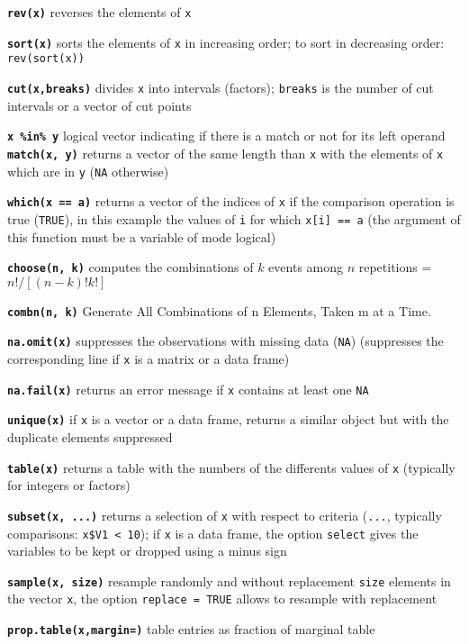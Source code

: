 \documentclass[10pt,landscape]{article}
\newcommand{\code}{\texttt}
\newcommand{\bcode}[1]{\texttt{\textbf{#1}}}
\newcommand\T{\code{TRUE}}
\begin{document}
\begin{multicols*}{3}
\bcode{rev(x)}  reverses the elements of \code{x}

\bcode{sort(x)}  sorts the elements of \code{x} in increasing order; to sort in decreasing order: \code{rev(sort(x))}

\bcode{cut(x,breaks)}  divides \code{x} into intervals (factors);
\code{breaks} is the number of cut intervals or a vector of cut points

\bcode{x \%in\% y} logical vector indicating if there is a match or not
for its left operand\\

\bcode{match(x, y)}  returns a vector of the same length than \code{x} with the elements of \code{x} which are in \code{y} (\code{NA} otherwise)

\bcode{which(x == a)}  returns a vector of the indices of \code{x} if the comparison operation is true (\T), in this example the values of \code{i} for which \code{x[i] == a} (the argument of this function must be a variable of mode logical)

\bcode{choose(n, k)}  computes the combinations of $k$ events among
$n$ repetitions = $n!/[(n-k)!k!]$

\bcode{combn(n, k)}  Generate All Combinations of n Elements, Taken m at a Time.

\bcode{na.omit(x)}  suppresses the observations with missing data (\code{NA}) (suppresses the corresponding line if \code{x} is a matrix or a data frame)

\bcode{na.fail(x)}  returns an error message if \code{x} contains at least one \code{NA}

\bcode{unique(x)}  if \code{x} is a vector or a data frame, returns a similar object but with the duplicate elements suppressed

\bcode{table(x)}  returns a table with the numbers of the differents values of \code{x} (typically for integers or factors)

\bcode{subset(x, ...)}  returns a selection of \code{x} with respect to criteria (\code{...}, typically comparisons: \code{x\$V1 < 10}); if \code{x} is a data frame, the option \code{select} gives the variables to be kept or dropped using a minus sign

\bcode{sample(x, size)}  resample randomly and without replacement \code{size} elements in the vector \code{x}, the option \code{replace = TRUE} allows to resample with replacement

\bcode{prop.table(x,margin=)} table entries as fraction of marginal table


\end{multicols*}
\end{document}
